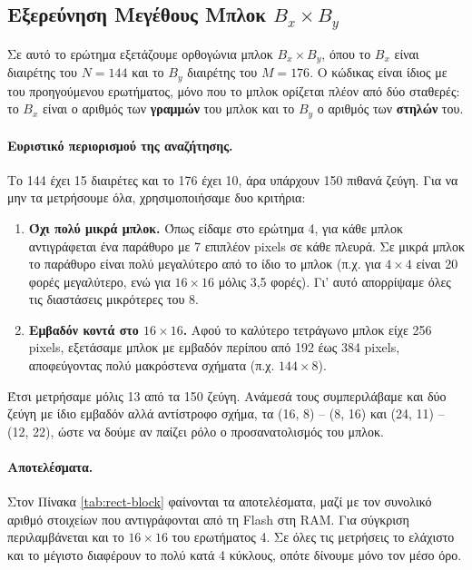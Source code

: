 \documentclass[12pt]{article}
\begin{document}
\subsection{Εξερεύνηση Μεγέθους Μπλοκ $B_x \times B_y$}
Σε αυτό το ερώτημα εξετάζουμε ορθογώνια μπλοκ $B_x \times B_y$, όπου το $B_x$ είναι διαιρέτης του $N = 144$ και το $B_y$ διαιρέτης του $M = 176$. Ο κώδικας είναι ίδιος με του προηγούμενου ερωτήματος, μόνο που το μπλοκ ορίζεται πλέον από δύο σταθερές: το $B_x$ είναι ο αριθμός των \textbf{γραμμών} του μπλοκ και το $B_y$ ο αριθμός των \textbf{στηλών} του.

\paragraph{Ευριστικό περιορισμού της αναζήτησης.}
Το 144 έχει 15 διαιρέτες και το 176 έχει 10, άρα υπάρχουν 150 πιθανά ζεύγη. Για να μην τα μετρήσουμε όλα, χρησιμοποιήσαμε δυο κριτήρια:
\begin{enumerate}
    \item \textbf{Όχι πολύ μικρά μπλοκ.} Όπως είδαμε στο ερώτημα 4, για κάθε μπλοκ αντιγράφεται ένα παράθυρο με 7 επιπλέον pixels σε κάθε πλευρά. Σε μικρά μπλοκ το παράθυρο είναι πολύ μεγαλύτερο από το ίδιο το μπλοκ (π.χ. για $4 \times 4$ είναι 20 φορές μεγαλύτερο, ενώ για $16 \times 16$ μόλις 3,5 φορές). Γι' αυτό απορρίψαμε όλες τις διαστάσεις μικρότερες του 8.
    \item \textbf{Εμβαδόν κοντά στο $16 \times 16$.} Αφού το καλύτερο τετράγωνο μπλοκ είχε 256 pixels, εξετάσαμε μπλοκ με εμβαδόν περίπου από 192 έως 384 pixels, αποφεύγοντας πολύ μακρόστενα σχήματα (π.χ. $144 \times 8$).
\end{enumerate}
Έτσι μετρήσαμε μόλις 13 από τα 150 ζεύγη. Ανάμεσά τους συμπεριλάβαμε και δύο ζεύγη με ίδιο εμβαδόν αλλά αντίστροφο σχήμα, τα (16, 8) -- (8, 16) και (24, 11) -- (12, 22), ώστε να δούμε αν παίζει ρόλο ο προσανατολισμός του μπλοκ.

\paragraph{Αποτελέσματα.}
Στον Πίνακα \ref{tab:rect-block} φαίνονται τα αποτελέσματα, μαζί με τον συνολικό αριθμό στοιχείων που αντιγράφονται από τη Flash στη RAM. Για σύγκριση περιλαμβάνεται και το $16 \times 16$ του ερωτήματος 4. Σε όλες τις μετρήσεις το ελάχιστο και το μέγιστο διαφέρουν το πολύ κατά 4 κύκλους, οπότε δίνουμε μόνο τον μέσο όρο.
\end{document}
